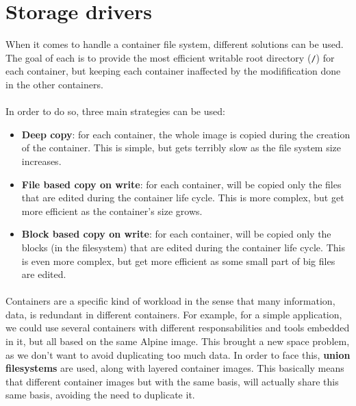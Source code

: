 \section{Storage drivers}
When it comes to handle a container file system, different solutions can be used.  The goal of each is to provide the most efficient writable root directory (\texttt{/}) for each container, but keeping each container inaffected by the modifification done in the other containers.

\paragraph{}In order to do so, three main strategies can be used:
\begin{itemize}
\renewcommand\labelitemi{--}
  \item \textbf{Deep copy}: for each container, the whole image is copied during the creation of the container.  This is simple, but gets terribly slow as the file system size increases.
  \item \textbf{File based copy on write}: for each container, will be copied only the files that are edited during the container life cycle.  This is more complex, but get more efficient as the container's size grows.
  \item \textbf{Block based copy on write}: for each container, will be copied only the blocks (in the filesystem) that are edited during the container life cycle.  This is even more complex, but get more efficient as some small part of big files are edited.
\end{itemize}

\paragraph{}Containers are a specific kind of workload in the sense that many information, data, is redundant in different containers.  For example, for a simple application, we could use several containers with different responsabilities and tools embedded in it, but all based on the same Alpine image.  This brought a new space problem, as we don't want to avoid duplicating too much data.  In order to face this, \textbf{union filesystems} are used, along with layered container images.  This basically means that different container images but with the same basis, will actually share this same basis, avoiding the need to duplicate it.

